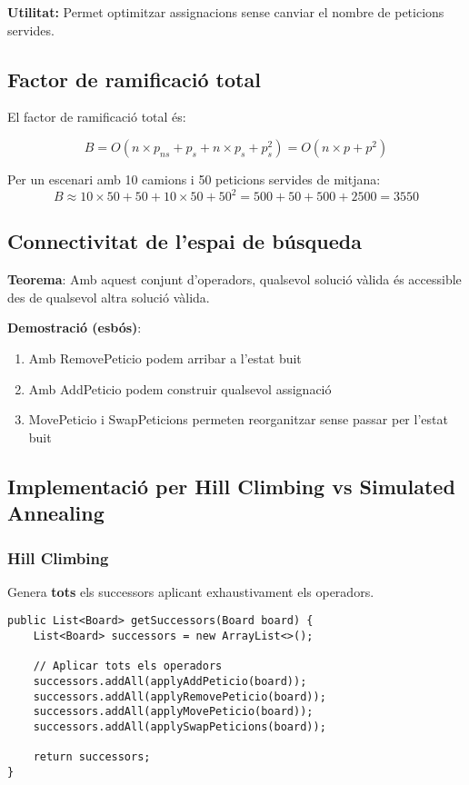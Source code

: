 \textbf{Utilitat:}
Permet optimitzar assignacions sense canviar el nombre de peticions servides.

\subsection{Factor de ramificació total}

El factor de ramificació total és:

\begin{equation}
B = O(n \times p_{ns} + p_s + n \times p_s + p_s^2) = O(n \times p + p^2)
\end{equation}

Per un escenari amb 10 camions i 50 peticions servides de mitjana:
\begin{equation}
B \approx 10 \times 50 + 50 + 10 \times 50 + 50^2 = 500 + 50 + 500 + 2500 = 3550
\end{equation}

\subsection{Connectivitat de l'espai de búsqueda}

\textbf{Teorema}: Amb aquest conjunt d'operadors, qualsevol solució vàlida és accessible des de qualsevol altra solució vàlida.

\textbf{Demostració (esbós)}:
\begin{enumerate}
    \item Amb RemovePeticio podem arribar a l'estat buit
    \item Amb AddPeticio podem construir qualsevol assignació
    \item MovePeticio i SwapPeticions permeten reorganitzar sense passar per l'estat buit
\end{enumerate}

\subsection{Implementació per Hill Climbing vs Simulated Annealing}

\subsubsection{Hill Climbing}
Genera \textbf{tots} els successors aplicant exhaustivament els operadors.

\begin{lstlisting}[caption={Generació de successors per HC}, label={lst:hc-gen}]
public List<Board> getSuccessors(Board board) {
    List<Board> successors = new ArrayList<>();
    
    // Aplicar tots els operadors
    successors.addAll(applyAddPeticio(board));
    successors.addAll(applyRemovePeticio(board));
    successors.addAll(applyMovePeticio(board));
    successors.addAll(applySwapPeticions(board));
    
    return successors;
}
\end{lstlisting}

